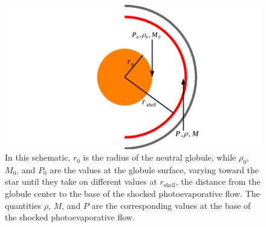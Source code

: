 \documentclass{book}
\begin{document}
\begin{figure}[htb]
    \centering \includegraphics[width=\textwidth]{imagenes_corregidas/Arreglo 02_n.pdf}
    \caption{In this schematic, $r_0$ is the radius of the neutral
      globule, while $\rho_0$, $M_0$, and $P_0$ are the values at the
      globule surface, varying toward the star until they take on
      different values at $r_\mathrm{shell}$, the distance from the
      globule center to the base of the shocked photoevaporative flow.
      The quantities $\rho$, $M$, and $P$ are the corresponding values
      at the base of the shocked photoevaporative flow.}
    \label{fig:parameters}
\end{figure}
\end{document}
